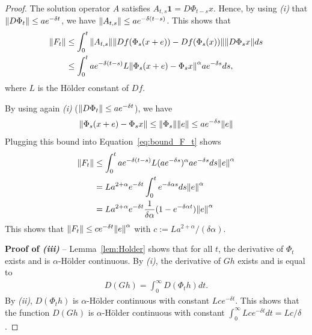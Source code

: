 \documentclass[sigconf]{acmart}
\newcommand\norm[1]{{\mathchoice{\bnorm{#1}}{\snorm{#1}}{\snorm{#1}}{\snorm{#1}}}}
\newcommand\bnorm[1]{\left\|#1\right\|}
\newcommand\snorm[1]{\|#1\|}
\begin{document}
\begin{proof}
  The solution operator $A$ satisfies
  $A_{t,s}\mathbf{1}=D\Phi_{t-s}x$. Hence, by using \emph{(i)} that
  $\norm{D\Phi_t}\le ae^{-\delta t}$, we have
  $\norm{A_{t,s}}\le ae^{-\delta (t-s)}$. This shows that
  \begin{align}
    \norm{F_t}&\le\int_0^t
                \norm{A_{t,s}}\norm{Df(\Phi_s(x+e))-Df(\Phi_s(x))}\norm{D\Phi_sx}ds
                \nonumber\\ 
              &\le \int_0^t ae^{-\delta (t-s)}
                L\norm{\Phi_s(x+e)-\Phi_sx}^\alpha a e^{-\delta s}ds,
                \label{eq:bound_F_t}
  \end{align}
  where $L$ is the Hölder constant of $Df$. 

  By using again \emph{(i)} ($\norm{D\Phi_t}\le ae^{-\delta t}$), we
  have
  \begin{align*}
    \norm{\Phi_s(x+e)-\Phi_sx} \le \norm{\Phi_s}\norm{e} \le
    ae^{-\delta s}\norm{e}
  \end{align*}
  Plugging this bound into Equation~\eqref{eq:bound_F_t} shows
  \begin{align*}
    \norm{F_t}&\le \int_0^t ae^{-\delta (t-s)}
                L(a e^{-\delta s})^\alpha  a e^{-\delta
                s}ds \norm{e}^\alpha \\
              &= L a^{2+\alpha} e^{-\delta t} \int_0^t
                e^{-\delta\alpha s}ds\norm{e}^\alpha\\
              & = L a^{2+\alpha} e^{-\delta t} \frac{1}{\delta \alpha}
                (1-e^{-\delta\alpha t})\norm{e}^\alpha
  \end{align*}
  This shows that $\norm{F_t}\le c e^{-\delta t}\norm{e}^\alpha$ with
  $c:=L a^{2+\alpha}/(\delta\alpha)$.


  \textbf{Proof of \emph{(iii)}} -- Lemma~\ref{lem:Holder} shows that
  for all $t$, the derivative of $\Phi_t$ exists and is
  $\alpha$-Hölder continuous. By \emph{(i)}, the derivative of $Gh$
  exists and is equal to 
  \begin{align*}
    D(Gh)= \int_0^\infty D(\Phi_th) dt. 
  \end{align*}
  By \emph{(ii)}, $D(\Phi_th)$ is $\alpha$-Hölder continuous with
  constant $Lce^{-\delta t}$. This shows that the function $D(Gh)$ is
  $\alpha$-Hölder continuous with constant
  $\int_0^\infty Lce^{-\delta t}dt = Lc/\delta$.
\end{proof}
\end{document}
